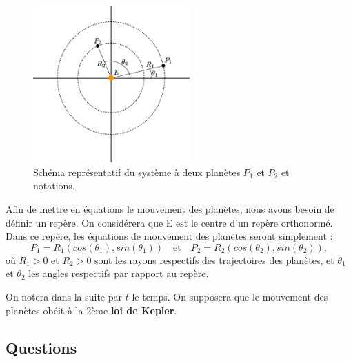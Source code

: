 \documentclass{../ficheTDTP}
\begin{document}
\begin{figure}[h]
	\begin{center}
            \includegraphics[width=6cm]{planete.eps}
        \end{center}
	\vspace{-5mm}
	\caption{Schéma représentatif du système à deux planètes $P_1$ et $P_2$ et notations.}\label{fig1}
\end{figure}	
	
	Afin de mettre en équations le mouvement des planètes, nous avons besoin de définir un repère. On considérera que E est le centre d'un repère orthonormé. Dans ce repère, les équations de mouvement des planètes seront simplement :
\[
	P_1 = R_1 (cos(\theta_1),sin(\theta_1)) \quad \text{et} \quad P_2 = R_2 (cos(\theta_2),sin(\theta_2)),
\]	
où $R_1>0$ et $R_2>0$ sont les rayons respectifs des trajectoires des planètes, et $\theta_1$ et $\theta_2$ les angles respectifs par rapport au repère.

 On notera dans la suite par $t$ le temps. On supposera que le mouvement des planètes obéit à la $2$ème \textbf{loi de Kepler}.

\subsection{Questions}
\end{document}
